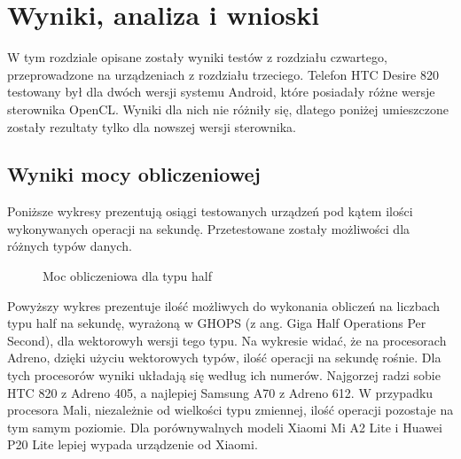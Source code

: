 \section[Wyniki, analiza i wnioski]{Wyniki, analiza i wnioski}
W tym rozdziale opisane zostały wyniki testów z rozdziału czwartego, przeprowadzone na urządzeniach z rozdziału trzeciego. Telefon HTC Desire 820 testowany był dla dwóch wersji systemu Android, które posiadały różne wersje sterownika OpenCL. Wyniki dla nich nie różniły się, dlatego poniżej umieszczone zostały rezultaty tylko dla nowszej wersji sterownika.
\subsection[Wyniki mocy obliczeniowej]{Wyniki mocy obliczeniowej}
Poniższe wykresy prezentują osiągi testowanych urządzeń pod kątem ilości wykonywanych operacji na sekundę. Przetestowane zostały możliwości dla różnych typów danych.
\begin{figure}[H]
\caption{Moc obliczeniowa dla typu half}
\end{figure}
Powyższy wykres prezentuje ilość możliwych do wykonania obliczeń na liczbach typu half na sekundę, wyrażoną w GHOPS (z ang. Giga Half Operations Per Second), dla wektorowyh wersji tego typu. Na wykresie widać, że na procesorach Adreno, dzięki użyciu wektorowych typów, ilość operacji na sekundę rośnie. Dla tych procesorów wyniki układają się według ich numerów. Najgorzej radzi sobie HTC 820 z Adreno 405, a najlepiej Samsung A70 z Adreno 612. W przypadku procesora Mali, niezależnie od wielkości typu zmiennej, ilość operacji pozostaje na tym samym poziomie. Dla porównywalnych modeli Xiaomi Mi A2 Lite i Huawei P20 Lite lepiej wypada urządzenie od Xiaomi.

